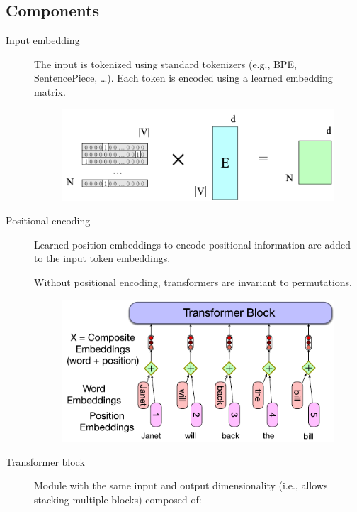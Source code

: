 \subsection{Components}

\begin{description}
    \item[Input embedding] 
        The input is tokenized using standard tokenizers (e.g., BPE, SentencePiece, \dots). Each token is encoded using a learned embedding matrix.

        \begin{figure}[H]
            \centering
            \includegraphics[width=0.45\linewidth]{./img/_transformer_embedding.pdf}
        \end{figure}

    \item[Positional encoding] 
        Learned position embeddings to encode positional information are added to the input token embeddings.

        \begin{remark}
            Without positional encoding, transformers are invariant to permutations.
        \end{remark}

        \begin{figure}[H]
            \centering
            \includegraphics[width=0.45\linewidth]{./img/_positional_encoding.pdf}
        \end{figure}

    \item[Transformer block] 
        Module with the same input and output dimensionality (i.e., allows stacking multiple blocks) composed of:
\end{description}
